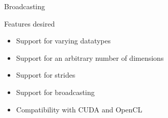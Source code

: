\documentclass[utf8x,xcolor=pdftex,dvipsnames,table]{beamer}
\begin{document}
\begin{frame}{Broadcasting}
\begin{center}
\end{center}
\end{frame}

\begin{frame}{Features desired}
\begin{itemize}
\item Support for varying datatypes
\item Support for an arbitrary number of dimensions
\item Support for strides
\item Support for broadcasting
\item Compatibility with CUDA and OpenCL
\end{itemize}
\end{frame}
\end{document}
